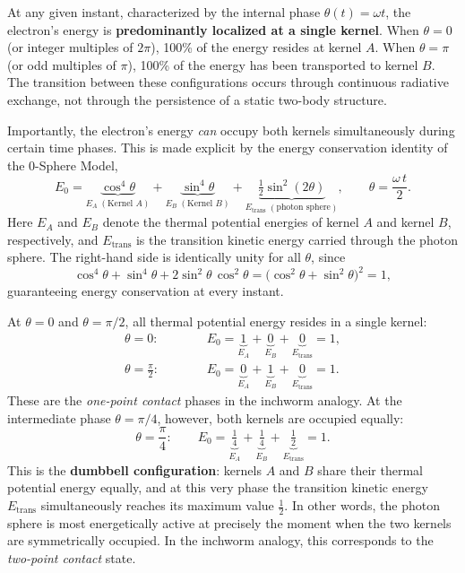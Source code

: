 \documentclass[12pt,letterpaper]{article}
\begin{document}
At any given instant, characterized by the internal phase $\theta(t) = \omega t$, the electron's energy is \textbf{predominantly localized at a single kernel}. When $\theta = 0$ (or integer multiples of $2\pi$), 100\% of the energy resides at kernel $A$. When $\theta = \pi$ (or odd multiples of $\pi$), 100\% of the energy has been transported to kernel $B$. The transition between these configurations occurs through continuous radiative exchange, not through the persistence of a static two-body structure.

Importantly, the electron's energy \textit{can} occupy both kernels simultaneously during certain time phases. This is made explicit by the energy conservation identity of the 0-Sphere Model,
\begin{equation}
  E_0 = \underbrace{\cos^4\!\theta}_{E_A\;(\text{Kernel }A)} + \underbrace{\sin^4\!\theta}_{E_B\;(\text{Kernel }B)} + \underbrace{\tfrac{1}{2}\sin^2\!(2\theta)}_{E_{\mathrm{trans}}\;(\text{photon sphere})}, \qquad \theta = \frac{\omega\, t}{2}.
  \label{eq:energy_conservation}
\end{equation}
Here $E_A$ and $E_B$ denote the thermal potential energies of kernel $A$ and kernel $B$, respectively, and $E_{\mathrm{trans}}$ is the transition kinetic energy carried through the photon sphere. The right-hand side is identically unity for all $\theta$, since
\[
  \cos^4\!\theta + \sin^4\!\theta + 2\sin^2\!\theta\,\cos^2\!\theta = \bigl(\cos^2\!\theta + \sin^2\!\theta\bigr)^2 = 1,
\]
guaranteeing energy conservation at every instant.

At $\theta = 0$ and $\theta = \pi/2$, all thermal potential energy resides in a single kernel:
\begin{align}
  \theta = 0:\qquad\quad &E_0 = \underbrace{1}_{E_A} + \underbrace{0}_{E_B} + \underbrace{0}_{E_{\mathrm{trans}}} = 1, \\[6pt]
  \theta = \frac{\pi}{2}:\qquad &E_0 = \underbrace{0}_{E_A} + \underbrace{1}_{E_B} + \underbrace{0}_{E_{\mathrm{trans}}} = 1.
\end{align}
These are the \textit{one-point contact} phases in the inchworm analogy. At the intermediate phase $\theta = \pi/4$, however, both kernels are occupied equally:
\begin{equation}
  \theta = \frac{\pi}{4}:\qquad E_0 = \underbrace{\tfrac{1}{4}}_{E_A} + \underbrace{\tfrac{1}{4}}_{E_B} + \underbrace{\tfrac{1}{2}}_{E_{\mathrm{trans}}} = 1.
\end{equation}
This is the \textbf{dumbbell configuration}: kernels $A$ and $B$ share their thermal potential energy equally, and at this very phase the transition kinetic energy $E_{\mathrm{trans}}$ simultaneously reaches its maximum value $\tfrac{1}{2}$. In other words, the photon sphere is most energetically active at precisely the moment when the two kernels are symmetrically occupied. In the inchworm analogy, this corresponds to the \textit{two-point contact} state.
\end{document}
